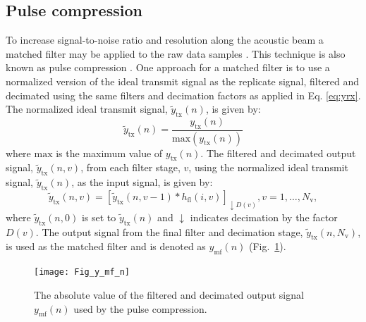 \documentclass[preprint,12pt,TurnOnLineNumbers]{JASAnew}
\newcommand{\samplesymt}{n}
\newcommand{\genidxsym}{i}
\newcommand{\stagesym}{v}
\newcommand{\nstages}{N_{\textrm{v}}}
\newcommand{\ytx}{y_{\textrm{tx}}}
\newcommand{\ytxnorm}{\tilde{y}_{\textrm{tx}}}
\newcommand{\ymf}{y_{\textrm{mf}}}
\newcommand{\decfac}{D}
\newcommand{\hfl}{h_{\textrm{fl}}}
\begin{document}
\subsection{Pulse compression}
To increase signal-to-noise ratio and resolution along the acoustic beam a matched filter may be applied to the raw data samples \citep{turin1960}. This technique is also known as pulse compression \citep{klauder1960}. One approach for a matched filter is to use a normalized version of the ideal transmit signal as the replicate signal, filtered and decimated using the same filters and decimation factors as applied in Eq. \ref{eq:yrx}. The normalized ideal transmit signal, $\ytxnorm(\samplesymt)$, is given by:
%
\begin{equation}
\label{eq:ytxnorm}
\ytxnorm(\samplesymt) = \frac{\ytx(\samplesymt)}{\textrm{max}(\ytx(\samplesymt))}\end{equation}
%
where $\textrm{max}$ is the maximum value of $\ytx(\samplesymt)$. The filtered and decimated output signal, $\ytxnorm(\samplesymt,\stagesym)$, from each filter stage, $\stagesym$, using the normalized ideal transmit signal, $\ytxnorm(\samplesymt)$, as the input signal, is given by:
%
\begin{equation}
\label{eq:FilterStagesTX}
\ytxnorm(\samplesymt,\stagesym) = \left[ \ytxnorm(\samplesymt,\stagesym-1) * \hfl(\genidxsym,\stagesym) \right]_{\downarrow \decfac(\stagesym)}, 
\stagesym = 1,\ldots,\nstages,
\end{equation}
%
where $\ytxnorm(\samplesymt,0)$ is set to $\ytxnorm(\samplesymt)$ and $\downarrow$ indicates decimation by the factor $\decfac(\stagesym)$. The output signal from the final filter and decimation stage, $\ytxnorm(\samplesymt,\nstages)$, is used as the matched filter and is denoted as $\ymf(\samplesymt)$  (Fig.~\ref{fi:y_mf_n}).

\begin{figure}
\texttt{[image: Fig\_y\_mf\_n]}
\caption{\label{fi:y_mf_n} The absolute value of the filtered and decimated output signal $\ymf(\samplesymt)$ used by the pulse compression.}
\end{figure}
\end{document}
